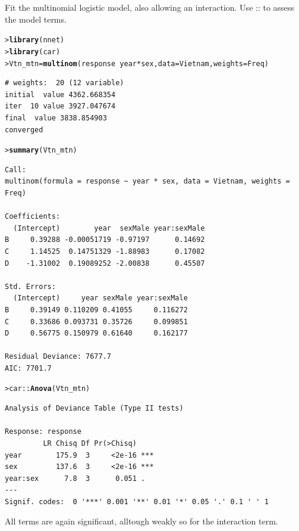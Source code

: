 \documentclass[10pt]{report}\usepackage[]{graphicx}\usepackage[]{color}
\makeatletter
\newcommand{\hlopt}[1]{\textcolor[rgb]{0,0,0}{#1}}%
\newcommand{\hlstd}[1]{\textcolor[rgb]{0.345,0.345,0.345}{#1}}%
\newcommand{\hlkwb}[1]{\textcolor[rgb]{0.69,0.353,0.396}{#1}}%
\newcommand{\hlkwc}[1]{\textcolor[rgb]{0.333,0.667,0.333}{#1}}%
\newcommand{\hlkwd}[1]{\textcolor[rgb]{0.737,0.353,0.396}{\textbf{#1}}}%
\newenvironment{kframe}{%
 \def\at@end@of@kframe{}%
 \ifinner\ifhmode%
  \def\at@end@of@kframe{\end{minipage}}%
  \begin{minipage}{\columnwidth}%
 \fi\fi%
 \def\FrameCommand##1{\hskip\@totalleftmargin \hskip-\fboxsep
 \colorbox{shadecolor}{##1}\hskip-\fboxsep
     \hskip-\linewidth \hskip-\@totalleftmargin \hskip\columnwidth}%
 \MakeFramed {\advance\hsize-\width
   \@totalleftmargin\z@ \linewidth\hsize
   \@setminipage}}%
 {\par\unskip\endMakeFramed%
 \at@end@of@kframe}
\newenvironment{knitrout}{}{} %
\renewenvironment{knitrout}{\small\renewcommand{\baselinestretch}{.85}}{} %
\makeatother
\begin{document}
\begin{Exercises}
\begin{enumerate*}
    \item  Fit the multinomial logistic model, also allowing an interaction.  Use ::
    to assess the model terms.
    \begin{ans}
\begin{knitrout}\footnotesize
{}\color{fgcolor}\begin{kframe}
\begin{alltt}
\hlstd{> }\hlkwd{library}\hlstd{(nnet)}
\hlstd{> }\hlkwd{library}\hlstd{(car)}
\hlstd{> }\hlstd{Vtn_mtn} \hlkwb{=} \hlkwd{multinom}\hlstd{(response} \hlopt{~} \hlstd{year} \hlopt{*} \hlstd{sex,} \hlkwc{data} \hlstd{= Vietnam,} \hlkwc{weights} \hlstd{= Freq)}
\end{alltt}
\begin{verbatim}
# weights:  20 (12 variable)
initial  value 4362.668354 
iter  10 value 3927.047674
final  value 3838.854903 
converged
\end{verbatim}
\begin{alltt}
\hlstd{> }\hlkwd{summary}\hlstd{(Vtn_mtn)}
\end{alltt}
\begin{verbatim}
Call:
multinom(formula = response ~ year * sex, data = Vietnam, weights = Freq)

Coefficients:
  (Intercept)        year  sexMale year:sexMale
B     0.39288 -0.00051719 -0.97197      0.14692
C     1.14525  0.14751329 -1.88983      0.17082
D    -1.31002  0.19089252 -2.00838      0.45507

Std. Errors:
  (Intercept)     year sexMale year:sexMale
B     0.39149 0.110209 0.41055     0.116272
C     0.33686 0.093731 0.35726     0.099851
D     0.56775 0.150979 0.61640     0.162177

Residual Deviance: 7677.7 
AIC: 7701.7 
\end{verbatim}
\begin{alltt}
\hlstd{> }\hlstd{car}\hlopt{::}\hlkwd{Anova}\hlstd{(Vtn_mtn)}
\end{alltt}
\begin{verbatim}
Analysis of Deviance Table (Type II tests)

Response: response
         LR Chisq Df Pr(>Chisq)    
year        175.9  3     <2e-16 ***
sex         137.6  3     <2e-16 ***
year:sex      7.8  3      0.051 .  
---
Signif. codes:  0 '***' 0.001 '**' 0.01 '*' 0.05 '.' 0.1 ' ' 1
\end{verbatim}
\end{kframe}
\end{knitrout}
    All terms are again significant, alltough weakly so for the
    interaction term.
    \end{ans}
    

\end{enumerate*}
\end{Exercises}
\end{document}
